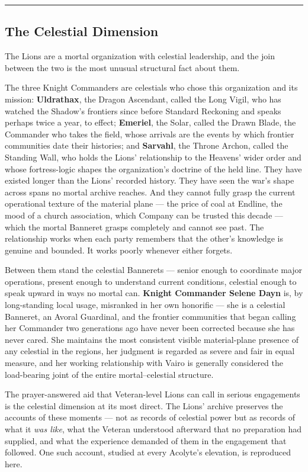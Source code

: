 \medskip\hrule\medskip

\subsection{The Celestial Dimension}

The Lions are a mortal organization with celestial leadership, and the join between the two is the most unusual structural fact about them.

The three Knight Commanders are celestials who chose this organization and its mission: \textbf{Uldrathax}, the Dragon Ascendant, called the Long Vigil, who has watched the Shadow's frontiers since before Standard Reckoning and speaks perhaps twice a year, to effect; \textbf{Emeriel}, the Solar, called the Drawn Blade, the Commander who takes the field, whose arrivals are the events by which frontier communities date their histories; and \textbf{Sarvahl}, the Throne Archon, called the Standing Wall, who holds the Lions' relationship to the Heavens' wider order and whose fortress-logic shapes the organization's doctrine of the held line. They have existed longer than the Lions' recorded history. They have seen the war's shape across spans no mortal archive reaches. And they cannot fully grasp the current operational texture of the material plane --- the price of coal at Endline, the mood of a church association, which Company can be trusted this decade --- which the mortal Banneret grasps completely and cannot see past. The relationship works when each party remembers that the other's knowledge is genuine and bounded. It works poorly whenever either forgets.

Between them stand the celestial Bannerets --- senior enough to coordinate major operations, present enough to understand current conditions, celestial enough to speak upward in ways no mortal can. \textbf{Knight Commander Selene Dayn} is, by long-standing local usage, misranked in her own honorific --- she is a celestial Banneret, an Avoral Guardinal, and the frontier communities that began calling her Commander two generations ago have never been corrected because she has never cared. She maintains the most consistent visible material-plane presence of any celestial in the regions, her judgment is regarded as severe and fair in equal measure, and her working relationship with Vairo is generally considered the load-bearing joint of the entire mortal--celestial structure.

The prayer-answered aid that Veteran-level Lions can call in serious engagements is the celestial dimension at its most direct. The Lions' archive preserves the accounts of these moments --- not as records of celestial power but as records of what it \textit{was like}, what the Veteran understood afterward that no preparation had supplied, and what the experience demanded of them in the engagement that followed. One such account, studied at every Acolyte's elevation, is reproduced here.

